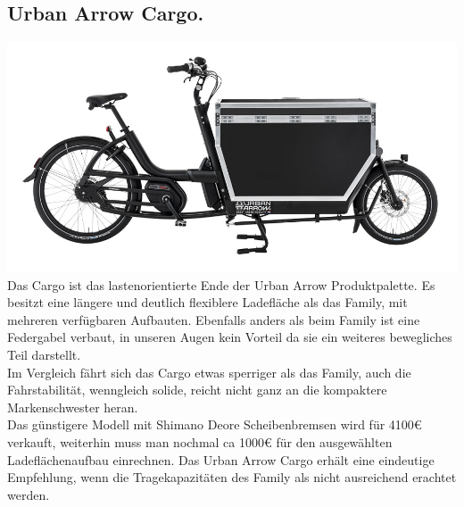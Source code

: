 \documentclass[a4paper,ngerman, 14pt] {scrartcl}
\begin{document}
\subsection{Urban Arrow Cargo.}
\includegraphics[scale=0.415]{urban_arrow_cargo.jpg}\\
Das Cargo ist das lastenorientierte Ende der Urban Arrow Produktpalette. Es besitzt eine längere und deutlich flexiblere Ladefläche als das Family, mit mehreren verfügbaren Aufbauten. Ebenfalls anders als beim Family ist eine Federgabel verbaut, in unseren Augen kein Vorteil da sie ein weiteres bewegliches Teil darstellt.\\
Im Vergleich fährt sich das Cargo etwas sperriger als das Family, auch die Fahrstabilität, wenngleich solide, reicht nicht ganz an die kompaktere Markenschwester heran.\\
Das günstigere Modell mit Shimano Deore Scheibenbremsen wird für 4100€ verkauft, weiterhin muss man nochmal ca 1000€ für den ausgewählten Ladeflächenaufbau einrechnen. Das Urban Arrow Cargo erhält eine eindeutige Empfehlung, wenn die Tragekapazitäten des Family als nicht ausreichend erachtet werden.
\end{document}
